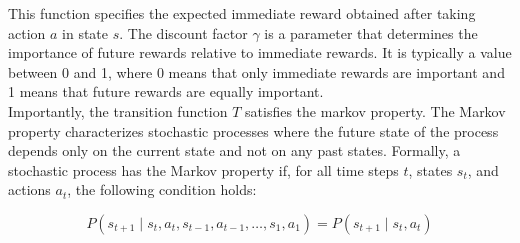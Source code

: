 This function specifies the expected immediate reward obtained after taking action $a$ in state $s$. The discount factor $\gamma$ is a 
parameter that determines the importance of future rewards relative to immediate rewards. It is typically a value between 0 and 1, where 0 means that 
only immediate rewards are important and 1 means that future rewards are equally important. \\

Importantly, the transition function $T$ satisfies the markov property. The Markov property characterizes stochastic processes where the future state of the 
process depends only on the current state and not on any past states. Formally, a stochastic process has the Markov property if, 
for all time steps $t$, states $s_t$, and actions $a_t$, the following condition holds:

\begin{equation}
    P(s_{t+1} \mid s_t, a_t, s_{t-1}, a_{t-1}, \ldots, s_1, a_1) = P(s_{t+1} \mid s_t, a_t)
\end{equation}

